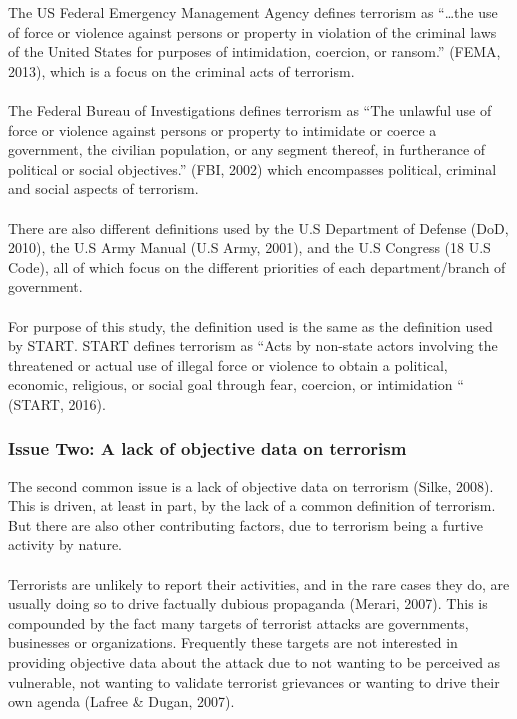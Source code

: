 \documentclass[10pt,a4paper]{article}
\begin{document}
The US Federal Emergency Management Agency defines terrorism as “…the use of force or violence against persons or property in violation of the criminal laws of the United States for purposes of intimidation, coercion, or ransom.” (FEMA, 2013), which is a focus on the criminal acts of terrorism.\\\\ 

The Federal Bureau of Investigations defines terrorism as “The unlawful use of force or violence against persons or property to intimidate or coerce a government, the civilian population, or any segment thereof, in furtherance of political or social objectives.” (FBI, 2002) which encompasses political, criminal and social aspects of terrorism. \\\\

There are also different definitions used by the U.S Department of Defense (DoD, 2010), the U.S Army Manual (U.S Army, 2001), and the U.S Congress (18 U.S Code), all of which focus on the different priorities of each department/branch of government. \\\\

For purpose of this study, the definition used is the same as the definition used by START. START defines terrorism as “Acts by non-state actors involving the threatened or actual use of illegal force or violence to obtain a political, economic, religious, or social goal through fear, coercion, or intimidation “ (START, 2016). 


			\subsubsection{Issue Two: A lack of objective data on terrorism}

The second common issue is a lack of objective data on terrorism (Silke, 2008). This is driven, at least in part, by the lack of a common definition of terrorism. But there are also other contributing factors, due to terrorism being a furtive activity by nature. \\\\

Terrorists are unlikely to report their activities, and in the rare cases they do, are usually doing so to drive factually dubious propaganda (Merari, 2007).  This is compounded by the fact many targets of terrorist attacks are governments, businesses or organizations. Frequently these targets are not interested in providing objective data about the attack due to not wanting to be perceived as vulnerable, not wanting to validate terrorist grievances or wanting to drive their own agenda (Lafree \& Dugan, 2007).\\\\
\end{document}
